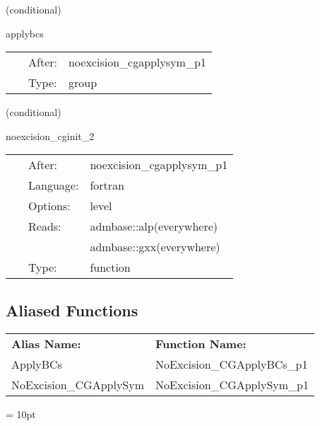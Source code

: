 \vspace{5mm}

   (conditional) 

\hspace{5mm} applybcs 

\hspace{5mm}{\it apply boundary conditions (symmetries) 1 } 


\hspace{5mm}

 \begin{tabular*}{160mm}{cll} 
~ & After:  & noexcision\_cgapplysym\_p1 \\ 
~ & Type:  & group \\ 
\end{tabular*} 


\vspace{5mm}

   (conditional) 

\hspace{5mm} noexcision\_cginit\_2 

\hspace{5mm}{\it initialise the conjugate gradient method 2 } 


\hspace{5mm}

 \begin{tabular*}{160mm}{cll} 
~ & After:  & noexcision\_cgapplysym\_p1 \\ 
~ & Language:  & fortran \\ 
~ & Options:  & level \\ 
~ & Reads:  & admbase::alp(everywhere) \\ 
~& ~ &admbase::gxx(everywhere)\\ 
~ & Type:  & function \\ 
\end{tabular*} 


\subsection*{Aliased Functions}

\hspace{5mm}

 \begin{tabular*}{160mm}{ll} 

{\bf Alias Name:} ~~~~~~~ & {\bf Function Name:} \\ 
ApplyBCs & NoExcision\_CGApplyBCs\_p1 \\ 
NoExcision\_CGApplySym & NoExcision\_CGApplySym\_p1 \\ 
\end{tabular*} 



\vspace{5mm}\parskip = 10pt 
